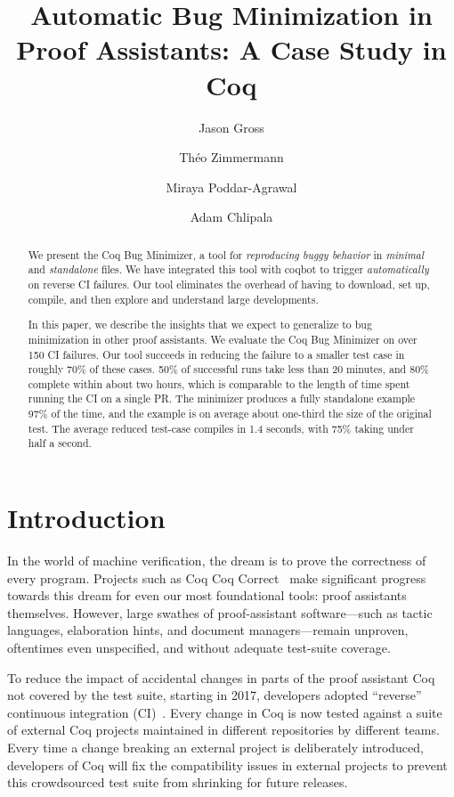 \documentclass[a4paper,USenglish,cleveref,autoref,thm-restate]{lipics-v2021}
\title{Automatic Bug Minimization in Proof Assistants: A Case Study in Coq}
\author{Jason Gross}{CSAIL, Massachusetts Institute of Technology, 77 Massachusetts Ave., Cambridge, MA 02139, USA \and MIRI, USA \and \url{https://jasongross.github.io/} }{jgross@mit.edu}{https://orcid.org/0000-0002-9427-4891}{}%
\author{Théo Zimmermann}{Inria, Université de Paris, CNRS, IRIF, F-75013, Paris, France \and \url{https://www.theozimmermann.net} }{theo@irif.fr}{https://orcid.org/0000-0002-3580-8806}{}
\author{Miraya Poddar-Agrawal}{Reed College, 3203 SE Woodstock Blvd, Portland, OR 97202, USA%
}{ragrawal@reed.edu}{https://orcid.org/0000-0001-7617-9180}{}
\author{Adam Chlipala}{CSAIL, Massachusetts Institute of Technology, 77 Massachusetts Ave., Cambridge, MA 02139, USA \and \url{http://adam.chlipala.net/} }{adamc@csail.mit.edu}{https://orcid.org/0000-0001-7085-9417}{}
\begin{document}
\maketitle

\begin{abstract}
  We present the Coq Bug Minimizer, a tool for \emph{reproducing buggy behavior} in \emph{minimal} and \emph{standalone} files.
  We have integrated this tool with coqbot to trigger \emph{automatically} on reverse CI failures.
  Our tool eliminates the overhead of having to download, set up, compile, and then explore and understand large developments.

  In this paper, we describe the insights that we expect to generalize to bug minimization in other proof assistants.
  We evaluate the Coq Bug Minimizer on over 150 CI failures.
  Our tool succeeds in reducing the failure to a smaller test case in roughly 70\% of these cases.
  50\% of successful runs take less than 20 minutes, and 80\% complete within about two hours, which is comparable to the length of time spent running the CI on a single PR.
  The minimizer produces a fully standalone example 97\% of the time, and the example is on average about one-third the size of the original test.
  The average reduced test-case compiles in 1.4 seconds, with 75\% taking under half a second.
\end{abstract}

\section{Introduction}

In the world of machine verification, the dream is to prove the correctness of every program.
Projects such as Coq Coq Correct~\cite{coq-coq-correct} make significant progress towards this dream for even our most foundational tools: proof assistants themselves.
However, large swathes of proof-assistant software—such as tactic languages, elaboration hints, and document managers—remain unproven, oftentimes even unspecified, and without adequate test-suite coverage.


To reduce the impact of accidental changes in parts of the proof assistant Coq not covered by the test suite, starting in 2017, developers adopted ``reverse'' continuous integration (CI)~\cite{zimmermann:tel-02451322}.
Every change in Coq is now tested against a suite of external Coq projects maintained in different repositories by different teams.
Every time a change breaking an external project is deliberately introduced, developers of Coq will fix the compatibility issues in external projects to prevent this crowdsourced test suite from shrinking for future releases.
\end{document}
